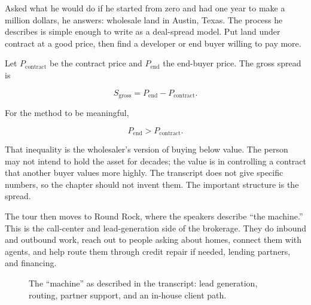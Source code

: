 Asked what he would do if he started from zero and had one year to make a million dollars, he answers: wholesale land in Austin, Texas. The process he describes is simple enough to write as a deal-spread model. Put land under contract at a good price, then find a developer or end buyer willing to pay more.

Let \(P_{\mathrm{contract}}\) be the contract price and \(P_{\mathrm{end}}\) the end-buyer price. The gross spread is

\begin{equation}
S_{\mathrm{gross}}
=
P_{\mathrm{end}} - P_{\mathrm{contract}}.
\end{equation}

For the method to be meaningful,

\begin{equation}
P_{\mathrm{end}} > P_{\mathrm{contract}}.
\end{equation}

That inequality is the wholesaler's version of buying below value. The person may not intend to hold the asset for decades; the value is in controlling a contract that another buyer values more highly. The transcript does not give specific numbers, so the chapter should not invent them. The important structure is the spread.

The tour then moves to Round Rock, where the speakers describe ``the machine.'' This is the call-center and lead-generation side of the brokerage. They do inbound and outbound work, reach out to people asking about homes, connect them with agents, and help route them through credit repair if needed, lending partners, and financing.

\begin{figure}
\centering
{}
\caption{The ``machine'' as described in the transcript: lead generation, routing, partner support, and an in-house client path.}
\end{figure}

